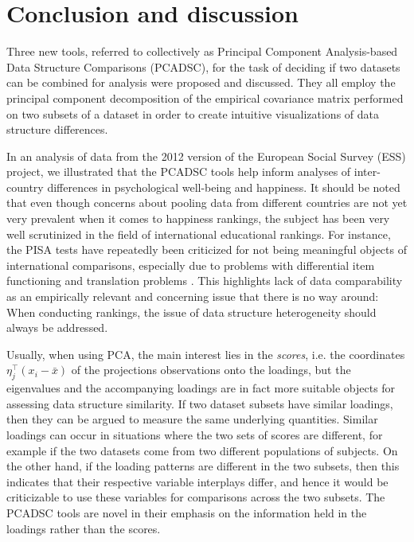 \documentclass[]{interact}
\theoremstyle{plain}%
\theoremstyle{definition}
\theoremstyle{remark}
\begin{document}
\section{Conclusion and discussion}\label{sec.Discussion}


Three new tools, referred to collectively as Principal Component Analysis-based Data Structure Comparisons (PCADSC), for the task of deciding if two datasets can be combined for analysis were proposed and discussed. They all employ the principal component decomposition of the empirical covariance matrix performed on two subsets of a dataset in order to create intuitive visualizations of data structure differences.

In an analysis of data from the 2012 version of the European Social Survey (ESS) project, we illustrated that the PCADSC tools help inform analyses of inter-country differences in psychological well-being and happiness. It should be noted that even though concerns about pooling data from different countries are not yet very prevalent when it comes to happiness rankings, the subject has been very well scrutinized in the field of international educational rankings. For instance, the PISA tests have repeatedly been criticized for not being meaningful objects of international comparisons, especially due to problems with differential item functioning \cite{Kankaras2014,Kreiner2014,ZwitserEtAl2017} and translation problems \cite{Asil2016}. This highlights lack of data comparability as an empirically relevant and concerning issue that there is no way around: When conducting rankings, the issue of data structure heterogeneity should always be addressed.

Usually, when using PCA, the main interest lies in the \textit{scores}, i.e. the coordinates $\eta_j^\top (x_i - \bar{x})$ of the projections observations onto the loadings, but the eigenvalues and the accompanying loadings are in fact more suitable objects for assessing data structure similarity. If two dataset subsets have similar loadings, then they can be argued to measure the same underlying quantities. Similar loadings can occur in situations where the two sets of scores are different, for example if the two datasets come from two different populations of subjects. On the other hand, if the loading patterns are different in the two subsets, then this indicates that their respective variable interplays differ, and hence it would be criticizable to use these variables for comparisons across the two subsets. The PCADSC tools are novel in their emphasis on the information held in the loadings rather than the scores. 
\end{document}

